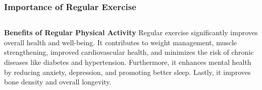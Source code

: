 \documentclass[5pt]{beamer}
\begin{document}
\begin{frame}
\frametitle{Importance of Regular Exercise}
\begin{columns}
\begin{column}{0.7\textwidth}
\begin{block}{\textbf{Benefits of Regular Physical Activity}}
Regular exercise significantly improves overall health and well-being. It contributes to weight management, muscle strengthening, improved cardiovascular health, and minimizes the risk of chronic diseases like diabetes and hypertension. Furthermore, it enhances mental health by reducing anxiety, depression, and promoting better sleep. Lastly, it improves bone density and overall longevity.
\end{block}
\end{column}
\end{columns}
\end{frame}
\end{document}
